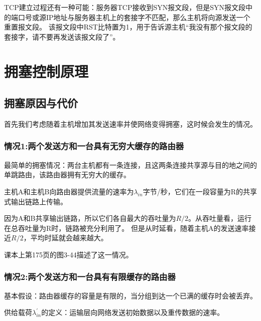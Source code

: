 \documentclass[a4paper,left=2.5cm,right=2.5cm,11pt]{article}
\begin{document}
	TCP建立过程还有一种可能：服务器TCP接收到SYN报文段，但是SYN报文段中的端口号或源IP地址与服务器主机上的套接字不匹配，那么主机将向源发送一个重置报文段。
	该报文段中RST比特置为1，用于告诉源主机“我没有那个报文段的套接字，请不要再发送该报文段了”。

\section{拥塞控制原理}
\subsection{拥塞原因与代价}
	首先我们考虑随着主机增加其发送速率并使网络变得拥塞，这时候会发生的情况。

\subsubsection{情况1:两个发送方和一台具有无穷大缓存的路由器}
	最简单的拥塞情况：两台主机都有一条连接，且这两条连接共享源与目的地之间的单跳路由，该路由器拥有无穷大的缓存。\par

	主机A和主机B向路由器提供流量的速率为$\lambda_{in}$字节/秒，它们在一段容量为R的共享式输出链路上传输。\par

	因为A和B共享输出链路，所以它们各自最大的吞吐量为$R/2$。从吞吐量看，运行在总吞吐量为R时，链路被充分利用了。
	但是从时延看，随着主机A的发送速率接近$R/2$，平均时延就会越来越大。\par

	课本上第175页的图3-44描述了这一情况。

\subsubsection{情况2:两个发送方和一台具有有限缓存的路由器}
	基本假设：路由器缓存的容量是有限的，当分组到达一个已满的缓存时会被丢弃。\par

	供给载荷$\lambda^'_{in}$的定义：运输层向网络发送初始数据以及重传数据的速率。\par
\end{document}
